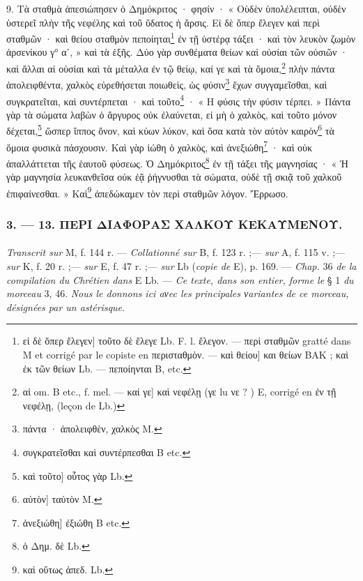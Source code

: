 \documentclass[a4paper, 11pt, oneside, polutonikogreek, french]{article}
\begin{document}
9. Τὰ σταθμὰ ἀπεσιώπησεν ὁ Δημόκριτος · φησίν · « Οὺδὲν ὑπολέλειπται, οὐδὲν ὑστερεῖ πλὴν τῆς νεφέλης καὶ τοῦ ὕδατος ἡ ἄρσις. Εἰ δὲ ὅπερ ἔλεγεν καὶ περὶ σταθμῶν · καὶ θείου σταθμὸν πεποίηται\footnote{εἰ δὲ ὅπερ ἔλεγεν] τοῦτο δὲ ἔλεγε Lb. F. l. ἔλεγον. --- περὶ σταθμῶν gratté dans M et corrigé par le copiste en περισταθμὸν. --- καὶ θείου] και θείων BAK ; καὶ ἐκ τῶν θείων Lb. --- πεποίηνται B, etc.} ἐν τῇ ὑστέρᾳ τάξει · καὶ τὸν λευκὸν ζωμὸν ἀρσενίκου γ° αʹ, » καὶ τὰ ἑξῆς. Δύο γὰρ συνθέματα θείων καὶ οὐσίαι τῶν οὐσιῶν · καὶ ἄλλαι αἱ οὐσίαι καὶ τὰ μέταλλα ἐν τῷ θείῳ, καί γε καὶ τὰ ὅμοια,\footnote{αἱ om. B etc., f. mel. --- καί γε] καὶ νεφέλῃ (γε lu νε ? ) E, corrigé en ἐν τῇ νεφέλῃ, (leçon de Lb.)} πλὴν πάντα ἀπολειφθέντα, χαλκὸς εὑρεθήσεται ποιωθεὶς, ὡς φύσιν\footnote{πάντα · ἀπολειφθὲν, χαλκὸς M.} ἔχων συγγαμεῖσθαι, καὶ συγκρατεῖται, καὶ συντέρπεται · καὶ τοῦτο\footnote{συγκρατεῖσθαι καὶ συντέρπεσθαι B etc.} · « Η φύσις τὴν φύσιν τέρπει. » Πάντα γὰρ τὰ σώματα λαβὼν ὁ ἄργυρος οὐκ ἐλαύνεται, εἰ μὴ ὁ χαλκὸς, καὶ τοῦτο μόνον δέχεται,\footnote{καὶ τοῦτο] οὗτος γὰρ Lb.} ὥσπερ ἵππος ὄνον, καὶ κύων λύκον, καὶ ὅσα κατὰ τὸν αὐτὸν καιρὸν\footnote{αὐτὸν] ταὐτὸν M.} τὰ ὅμοια φυσικὰ πάσχουσιν. Καὶ γὰρ ἰώθη ὁ χαλκὸς, καὶ ἀνεξιώθη\footnote{ἀνεξιώθη] ἐξιώθη B etc.} · καὶ οὐκ ἀπαλλάττεται τῆς ἑαυτοῦ φύσεως. Ὁ Δημόκριτος\footnote{ὁ Δημ. δὲ Lb.} ἐν τῇ τάξει τῆς μαγνησίας · « Ἡ γὰρ μαγνησία λευκανθεῖσα οὐκ ἐᾷ ῥήγνυσθαι τὰ σώματα, οὐδὲ τῇ σκιᾷ τοῦ χαλκοῦ ἐπιφαίνεσθαι. » Καὶ\footnote{καὶ οὕτως ἀπεδ. Lb.} ἀπεδώκαμεν τὸν περὶ σταθμῶν λόγον. Ἔρρωσο.

\bigskip
\centerline{\EightStarTaper}
\centerline{\EightStarTaper\EightStarTaper}
\bigskip

\subsubsection{3. --- 13. ΠΕΡΙ ΔΙΑΦΟΡΑΣ ΧΑΛΚΟΥ ΚΕΚΑΥΜΕΝΟΥ.}
\paragraph{}
\emph{Transcrit sur} M, f. 144 r. --- \emph{Collationné sur} B, f. 123 r. ;--- \emph{sur} A, f. 115 v. ;--- \emph{sur} K, f. 20 r. ;--- \emph{sur} E, f. 47 r. ;--- \emph{sur} Lb (\emph{copie de} E), p. 169. --- \emph{Chap.} 36 \emph{de la compilation du Chrétien dans} E Lb. --- \emph{Ce texte, dans son entier, forme le} § 1 \emph{du morceau} 3, 46. \emph{Nous le donnons ici aνec les principales νariantes de ce morceau, désignées par un astérisque}.
\end{document}
